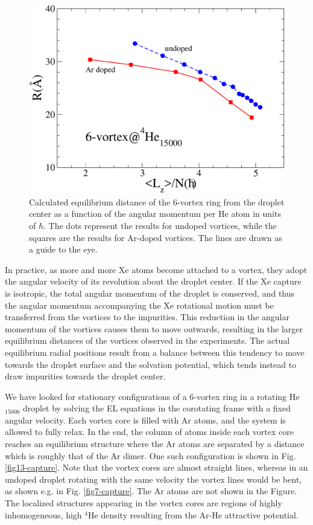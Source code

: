 \begin{figure}[!]
\centerline{\includegraphics[width=0.9\linewidth,clip]{fig14}}
\caption{\label{fig14-capture} 
Calculated equilibrium distance of the 6-vortex ring
from the droplet center as a function of the 
angular momentum per He atom in units of $\hbar$. 
The dots represent the results for undoped vortices, while the squares are the results for 
Ar-doped vortices. The lines are drawn as a guide to the eye.
}
\end{figure}

In practice, as more and more Xe atoms become
attached to a vortex, they adopt the angular velocity of its
revolution about the droplet center. 
If the Xe capture is isotropic, the total angular momentum of the droplet is conserved, and 
thus the angular momentum accompanying the Xe rotational motion must be
transferred from the vortices to the impurities. This reduction in the angular momentum of the
vortices causes them to move outwards, 
resulting in the larger
equilibrium distances of the vortices observed in 
the experiments. The actual equilibrium radial positions
result from a balance between this tendency to 
move towards the droplet surface 
and the solvation potential, 
which tends instead to draw impurities towards the droplet
center.

We have looked for stationary configurations of a 6-vortex ring
in a rotating He$_{15000}$ droplet by solving the
EL equations in the corotating frame with a fixed
angular velocity. Each vortex core is filled with Ar
atoms, and the system is allowed to fully relax.
In the end, the column of atoms inside each vortex core reaches an equilibrium structure 
where the Ar atoms are separated by a distance which  is roughly that of the Ar dimer.
One such configuration is shown in  Fig. \ref{fig13-capture}. Note that 
the vortex cores are almost straight lines, whereas in an
undoped droplet rotating with the same velocity 
the vortex lines would be bent, 
as shown  e.g. in Fig. \ref{fig7-capture}.
The Ar atoms are not shown in the Figure.
The localized structures appearing in the vortex cores are 
regions of highly inhomogeneous, high  $^4$He density
resulting from the Ar-He attractive potential.

